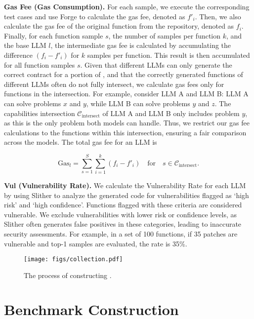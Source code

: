 \noindent
\textbf{Gas Fee (Gas Consumption).}
For each sample, we execute the corresponding test cases and use Forge to calculate the gas fee, denoted as \( f'_i \). 
Then, we also calculate the gas fee of the original function from the repository, denoted as \( f_i \).
Finally, for each function sample \( s \), the number of samples per function \( k \), and the base LLM \( l \), the intermediate gas fee is calculated by accumulating the difference \( (f_i - f'_i) \) for \( k \) samples per function.
This result is then accumulated for all function samples \( s \). 
Given that different LLMs can only generate the correct contract for a portion of \mytitle, and that the correctly generated functions of different LLMs often do not fully intersect, we calculate gas fees only for functions in the intersection. 
For example, consider LLM A and LLM B: LLM A can solve problems \( x \) and \( y \), while LLM B can solve problems \( y \) and \( z \). 
The capabilities intersection \( \mathcal{C}_{\text{intersect}} \) of LLM A and LLM B only includes problem \( y \), as this is the only problem both models can handle. 
Thus, we restrict our gas fee calculations to the functions within this intersection, ensuring a fair comparison across the models. 
The total gas fee for an LLM is


\vspace{-0.5cm}
\begin{equation}
\text{Gas}_{l} = \sum_{s=1}^{S} \sum_{i=1}^{k} (f_i - f'_i) \quad \text{for} \quad s \in \mathcal{C}_{\text{intersect}}.
\end{equation}


\noindent
\textbf{Vul (Vulnerability Rate).}  
We calculate the Vulnerability Rate for each LLM by using Slither to analyze the generated code for vulnerabilities flagged as `high risk' and `high confidence'. 
Functions flagged with these criteria are considered vulnerable. 
We exclude vulnerabilities with lower risk or confidence levels, as Slither often generates false positives in these categories, leading to inaccurate security assessments. 
For example, in a set of 100 functions, if 35 patches are vulnerable and top-1 samples are evaluated, the rate is 35\%.


\begin{figure}[htbp!]
    \centering
    \texttt{[image: figs/collection.pdf]}
    \caption{The process of constructing \datasetname.}
    \label{fig:collection}
\end{figure}


\section{Benchmark Construction}


